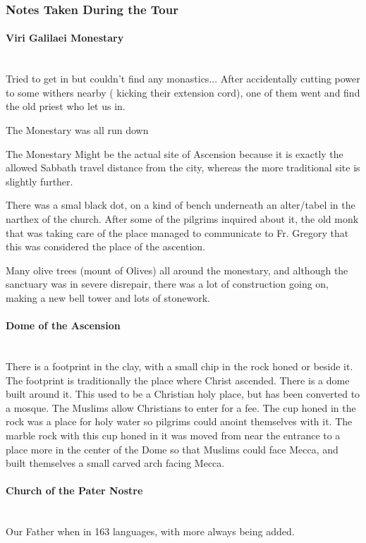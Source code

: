 \documentclass[letterpaper]{report}
\begin{document}
\subsubsection{Notes Taken During the Tour}
\begin{multicols}{2}
\paragraph{Viri Galilaei Monestary}\mbox{}\\
Tried to get in but couldn't find any monastics... After accidentally cutting power to some withers nearby ( kicking their extension cord), one of them went and find the old priest who let us in.

The Monestary was all run down

The Monestary Might be the actual site of Ascension because it is exactly the allowed Sabbath travel distance from the city, whereas the more traditional site is slightly further.

There was a smal black dot, on a kind of bench underneath an alter/tabel in the narthex of the church.
After some of the pilgrims inquired about it,
the old monk that was taking care of the place managed to communicate to Fr. Gregory that this was considered the place
of the ascention.

Many olive trees (mount of Olives) all around the monestary,
and although the sanctuary was in severe
disrepair,
there was a lot of construction going on,
making a new bell tower and lots of stonework.


\paragraph{Dome of the Ascension}\mbox{}\\
There is a footprint in the clay, with a small chip in the rock honed or beside it.
The footprint is traditionally the place where Christ ascended. There is a dome built around it. This used to be a Christian holy place, but has been converted to a mosque. The Muslims allow Christians to enter for a fee.
The cup honed in the rock was a place for holy water so pilgrims could anoint themselves with it. The marble rock with this cup honed in it was moved from near the entrance to a place more in the center of the Dome so that Muslims could face Mecca, and built themselves a small carved arch facing Mecca.

\paragraph{Church of the Pater Nostre}\mbox{}\\
Our Father when in 163 languages, with more always being added.


\end{multicols}
\end{document}

